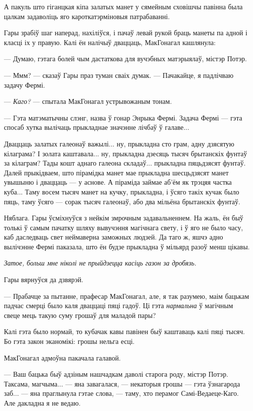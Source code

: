 А пакуль што гіганцкая кіпа залатых манет у сямейным сховішчы павінна была цалкам задаволіць яго
кароткатэрміновыя патрабаванні.

Гары зрабіў шаг наперад, нахіліўся, і пачаў левай рукой браць манеты па адной і класці іх у правую.
Калі ён налічыў дваццаць, МакГонагал кашлянула:

--- Думаю, гэтага болей чым дастаткова для вучэбных матэрыялаў, містэр Потэр.

--- Ммм? --- сказаў Гары праз туман сваіх думак. --- Пачакайце, я падлічваю задачу Фермі.

--- \emph{Каго?} --- спытала МакГонагал устрывожаным тонам.

--- Гэта матэматычны слэнг, назва ў гонар Энрыка Фермі. Задача Фермі --- гэта спосаб хутка
вылічаць прыкладнае значэнне лічбаў ў галаве...

Дваццаць залатых галеонаў важылі... ну, прыкладна сто грам, адну дзясятую кілаграма? І
золата каштавала... ну,
прыкладна дзесяць тысяч брытанскіх фунтаў за кілаграм? Тады кошт аднаго галеона складаў... 
прыкладна пяцьдзясят фунтаў. Далей прыкідваем, што пірамідка манет мае прыкладна шесцьдзясят
манет увышыню і дваццаць --- у аснове. А піраміда займае аб'ём як трэцяя частка куба...
Таму восем тысяч манет на кучку, прыкладна, і ўсяго такіх кучак было пяць, таму ўсяго ---
сорак тысяч галеонаў, або два мільёна брытанскіх фунтаў.

Няблага. Гары ўсміхнуўся з нейкім змрочным задавальненнем. На жаль, ён быў толькі ў самым 
пачатку шляху вывучэння магічнага свету, і ў яго не было часу, каб даследваць свет неймаверна
заможных людзей. Да таго ж, яшчэ адно вылічэнне Фермі паказала, што ён будзе прыкладна ў 
мільярд разоў менш цікавы.

\emph{Затое, больш мне ніколі не прыйдзецца касіць газон за дробязь.}

Гары вярнуўся да дзвярэй. 

--- Прабачце за пытанне, прафесар МакГонагал, але, я так разумею, маім бацькам падчас смерці
было каля дваццаці пяці гадоў. Ці гэта \emph{нармальна} ў магічным свеце мець такую суму грошаў
для маладой пары? 

Калі гэта было нормай, то кубачак кавы павінен быў каштаваць калі пяці 
тысяч. Бо гэта закон эканомікі: грошы нельга есці.

МакГонагал адмоўна пакачала галавой.

--- Ваш бацька быў адзіным нашчадкам даволі старога роду, містэр Потэр. Таксама, магчыма...
--- яна завагалася, --- некаторыя грошы --- гэта ўзнагарода заб... --- яна праглынула гэтае слова, --- 
таму, хто перамог Самі-Ведаеце-Каго. Але дакладна я не ведаю.

